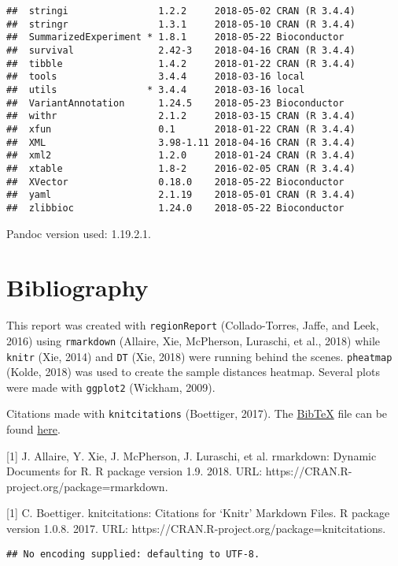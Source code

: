 \documentclass[]{article}
\begin{document}
\begin{verbatim}
##  stringi                1.2.2     2018-05-02 CRAN (R 3.4.4)
##  stringr                1.3.1     2018-05-10 CRAN (R 3.4.4)
##  SummarizedExperiment * 1.8.1     2018-05-22 Bioconductor  
##  survival               2.42-3    2018-04-16 CRAN (R 3.4.4)
##  tibble                 1.4.2     2018-01-22 CRAN (R 3.4.4)
##  tools                  3.4.4     2018-03-16 local         
##  utils                * 3.4.4     2018-03-16 local         
##  VariantAnnotation      1.24.5    2018-05-23 Bioconductor  
##  withr                  2.1.2     2018-03-15 CRAN (R 3.4.4)
##  xfun                   0.1       2018-01-22 CRAN (R 3.4.4)
##  XML                    3.98-1.11 2018-04-16 CRAN (R 3.4.4)
##  xml2                   1.2.0     2018-01-24 CRAN (R 3.4.4)
##  xtable                 1.8-2     2016-02-05 CRAN (R 3.4.4)
##  XVector                0.18.0    2018-05-22 Bioconductor  
##  yaml                   2.1.19    2018-05-01 CRAN (R 3.4.4)
##  zlibbioc               1.24.0    2018-05-22 Bioconductor
\end{verbatim}

Pandoc version used: 1.19.2.1.

\section{Bibliography}\label{bibliography}

This report was created with \texttt{regionReport} (Collado-Torres,
Jaffe, and Leek, 2016) using \texttt{rmarkdown} (Allaire, Xie,
McPherson, Luraschi, et al., 2018) while \texttt{knitr} (Xie, 2014) and
\texttt{DT} (Xie, 2018) were running behind the scenes.
\texttt{pheatmap} (Kolde, 2018) was used to create the sample distances
heatmap. Several plots were made with \texttt{ggplot2} (Wickham, 2009).

Citations made with \texttt{knitcitations} (Boettiger, 2017). The
\href{http://www.bibtex.org/}{BibTeX} file can be found
\href{DESeq2Report.bib}{here}.

{[}1{]} J. Allaire, Y. Xie, J. McPherson, J. Luraschi, et al. rmarkdown:
Dynamic Documents for R. R package version 1.9. 2018. URL:
https://CRAN.R-project.org/package=rmarkdown.

{[}1{]} C. Boettiger. knitcitations: Citations for `Knitr' Markdown
Files. R package version 1.0.8. 2017. URL:
https://CRAN.R-project.org/package=knitcitations.

\begin{verbatim}
## No encoding supplied: defaulting to UTF-8.
\end{verbatim}
\end{document}
